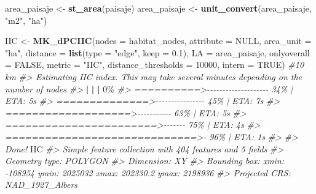 \documentclass[
]{book}
\newenvironment{Shaded}{\begin{snugshade}}{\end{snugshade}}
\newcommand{\AttributeTok}[1]{\textcolor[rgb]{0.13,0.29,0.53}{#1}}
\newcommand{\CommentTok}[1]{\textcolor[rgb]{0.56,0.35,0.01}{\textit{#1}}}
\newcommand{\ConstantTok}[1]{\textcolor[rgb]{0.56,0.35,0.01}{#1}}
\newcommand{\DecValTok}[1]{\textcolor[rgb]{0.00,0.00,0.81}{#1}}
\newcommand{\ErrorTok}[1]{\textcolor[rgb]{0.64,0.00,0.00}{\textbf{#1}}}
\newcommand{\FloatTok}[1]{\textcolor[rgb]{0.00,0.00,0.81}{#1}}
\newcommand{\FunctionTok}[1]{\textcolor[rgb]{0.13,0.29,0.53}{\textbf{#1}}}
\newcommand{\NormalTok}[1]{#1}
\newcommand{\OtherTok}[1]{\textcolor[rgb]{0.56,0.35,0.01}{#1}}
\newcommand{\SpecialCharTok}[1]{\textcolor[rgb]{0.81,0.36,0.00}{\textbf{#1}}}
\newcommand{\StringTok}[1]{\textcolor[rgb]{0.31,0.60,0.02}{#1}}
\begin{document}
\begin{Shaded}
\begin{Highlighting}[]
\NormalTok{area\_paisaje }\OtherTok{\textless{}{-}} \FunctionTok{st\_area}\NormalTok{(paisaje) }
\NormalTok{area\_paisaje }\OtherTok{\textless{}{-}} \FunctionTok{unit\_convert}\NormalTok{(area\_paisaje, }\StringTok{"m2"}\NormalTok{, }\StringTok{"ha"}\NormalTok{) }

\NormalTok{IIC }\OtherTok{\textless{}{-}} \FunctionTok{MK\_dPCIIC}\NormalTok{(}\AttributeTok{nodes =}\NormalTok{ habitat\_nodes,}
                \AttributeTok{attribute =} \ConstantTok{NULL}\NormalTok{,}
                \AttributeTok{area\_unit =} \StringTok{"ha"}\NormalTok{,}
                \AttributeTok{distance =} \FunctionTok{list}\NormalTok{(}\AttributeTok{type =} \StringTok{"edge"}\NormalTok{, }\AttributeTok{keep =} \FloatTok{0.1}\NormalTok{),}
                \AttributeTok{LA =}\NormalTok{ area\_paisaje,}
                \AttributeTok{onlyoverall =} \ConstantTok{FALSE}\NormalTok{,}
                \AttributeTok{metric =} \StringTok{"IIC"}\NormalTok{,}
                \AttributeTok{distance\_thresholds =} \DecValTok{10000}\NormalTok{,}
                \AttributeTok{intern =} \ConstantTok{TRUE}\NormalTok{) }\CommentTok{\#10 km}
\CommentTok{\#\textgreater{} Estimating IIC index. This may take several minutes depending on the number of nodes}
\CommentTok{\#\textgreater{} }
  \SpecialCharTok{|}                                                        
  \ErrorTok{|}                                                  \ErrorTok{|}   \DecValTok{0}\NormalTok{\%}
\CommentTok{\#\textgreater{}  ==========\textgreater{}{-}{-}{-}{-}{-}{-}{-}{-}{-}{-}{-}{-}{-}{-}{-}{-}{-}{-}{-}{-}   34\% |  ETA:  5s}
\CommentTok{\#\textgreater{}  ==============\textgreater{}{-}{-}{-}{-}{-}{-}{-}{-}{-}{-}{-}{-}{-}{-}{-}{-}   45\% |  ETA:  7s}
\CommentTok{\#\textgreater{}  ===================\textgreater{}{-}{-}{-}{-}{-}{-}{-}{-}{-}{-}{-}   63\% |  ETA:  5s}
\CommentTok{\#\textgreater{}  =======================\textgreater{}{-}{-}{-}{-}{-}{-}{-}   75\% |  ETA:  4s}
\CommentTok{\#\textgreater{}  =============================\textgreater{}{-}   96\% |  ETA:  1s}
\CommentTok{\#\textgreater{} }
\CommentTok{\#\textgreater{} Done!}
\NormalTok{IIC}
\CommentTok{\#\textgreater{} Simple feature collection with 404 features and 5 fields}
\CommentTok{\#\textgreater{} Geometry type: POLYGON}
\CommentTok{\#\textgreater{} Dimension:     XY}
\CommentTok{\#\textgreater{} Bounding box:  xmin: {-}108954 ymin: 2025032 xmax: 202330.2 ymax: 2198936}
\CommentTok{\#\textgreater{} Projected CRS: NAD\_1927\_Albers}

\end{Highlighting}
\end{Shaded}
\end{document}
